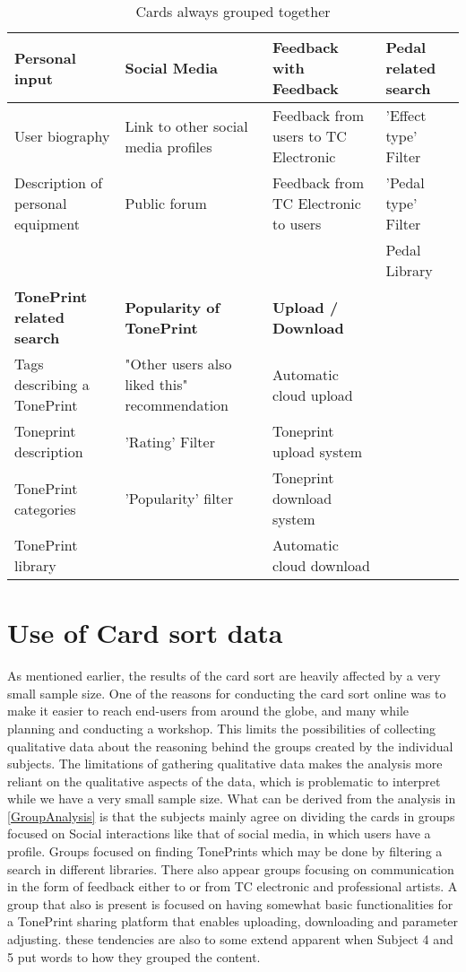 \begin{table}[h]
\begin{tabularx}{\textwidth}{|R|R|R|R|}
\hline
{} \textbf{Personal input} & \textbf{Social Media} & \textbf{Feedback with Feedback} & \textbf{Pedal related search}\\ \hline
User biography & Link to other social media profiles & Feedback from users to TC Electronic & 'Effect type' Filter \\
Description of personal equipment & Public forum & Feedback from TC Electronic to users & 'Pedal type' Filter \\ 
&&& Pedal Library \\ \hline
{} \textbf{TonePrint related search} & \textbf{Popularity of TonePrint} & \textbf{Upload / Download} & \\ \hline
Tags describing a TonePrint & "Other users also liked this" recommendation & Automatic cloud upload & \\
Toneprint description & 'Rating' Filter & Toneprint upload system & \\ 
TonePrint categories & 'Popularity' filter & Toneprint download system & \\
TonePrint library & & Automatic cloud download & \\ \hline
\end{tabularx}
\caption{Cards always grouped together}
\label{FrequentGroups}
\end{table}


\section{Use of Card sort data}
\label{UseOfCardSortData}
As mentioned earlier, the results of the card sort are heavily affected by a very small sample size. One of the reasons for conducting the card sort online was to make it easier to reach end-users from around the globe, and many while planning and conducting a workshop. This limits the possibilities of collecting qualitative data about the reasoning behind the groups created by the individual subjects. The limitations of gathering qualitative data makes the analysis more reliant on the qualitative aspects of the data, which is problematic to interpret while we have a very small sample size. What can be derived from the analysis in \autoref{GroupAnalysis} is that the subjects mainly agree on dividing the cards in groups focused on Social interactions like that of social media, in which users have a profile. Groups focused on finding TonePrints which may be done by filtering a search in different libraries. There also appear groups focusing on communication in the form of feedback either to or from TC electronic and professional artists. A group that also is present is focused on having somewhat basic functionalities for a TonePrint sharing platform that enables uploading, downloading and parameter adjusting. these tendencies are also to some extend apparent when Subject 4 and 5 put words to how they grouped the content.\\

